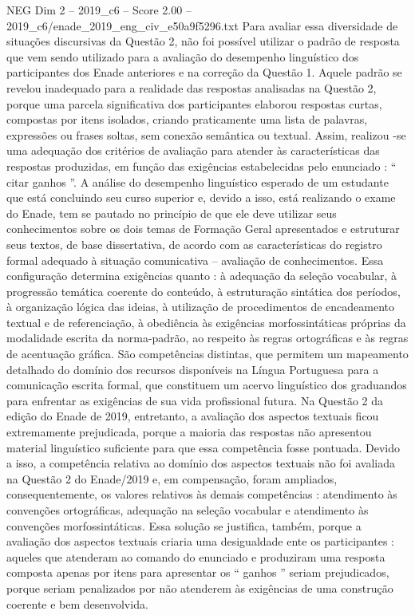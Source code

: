 \begin{textsample}{NEG Dim 2 – 2019\_c6 – Score 2.00 – 2019\_c6/enade\_2019\_eng\_civ\_e50a9f5296.txt}
Para avaliar essa diversidade de situações discursivas da Questão 2, não foi possível utilizar o padrão de resposta que vem sendo utilizado para a avaliação do desempenho linguístico dos participantes dos Enade anteriores e na correção da Questão 1.
Aquele padrão se revelou inadequado para a realidade das respostas analisadas na Questão 2, porque uma parcela significativa dos participantes elaborou respostas curtas, compostas por itens isolados, criando praticamente uma lista de palavras, expressões ou frases soltas, sem conexão semântica ou textual.
Assim, realizou -se uma adequação dos critérios de avaliação para atender às características das respostas produzidas, em função das exigências estabelecidas pelo enunciado : “ citar ganhos ”.
A análise do desempenho linguístico esperado de um estudante que está concluindo seu curso superior e, devido a isso, está realizando o exame do Enade, tem se pautado no princípio de que ele deve utilizar seus conhecimentos sobre os dois temas de Formação Geral apresentados e estruturar seus textos, de base dissertativa, de acordo com as características do registro formal adequado à situação comunicativa – avaliação de conhecimentos.
Essa configuração determina exigências quanto : à adequação da seleção vocabular, à progressão temática coerente do conteúdo, à estruturação sintática dos períodos, à organização lógica das ideias, à utilização de procedimentos de encadeamento textual e de referenciação, à obediência às exigências morfossintáticas próprias da modalidade escrita da norma-padrão, ao respeito às regras ortográficas e às regras de acentuação gráfica.
São competências distintas, que permitem um mapeamento detalhado do domínio dos recursos disponíveis na Língua Portuguesa para a comunicação escrita formal, que constituem um acervo linguístico dos graduandos para enfrentar as exigências de sua vida profissional futura.
Na Questão 2 da edição do Enade de 2019, entretanto, a avaliação dos aspectos textuais ficou extremamente prejudicada, porque a maioria das respostas não apresentou material linguístico suficiente para que essa competência fosse pontuada.
Devido a isso, a competência relativa ao domínio dos aspectos textuais não foi avaliada na Questão 2 do Enade/2019 e, em compensação, foram ampliados, consequentemente, os valores relativos às demais competências : atendimento às convenções ortográficas, adequação na seleção vocabular e atendimento às convenções morfossintáticas.
Essa solução se justifica, também, porque a avaliação dos aspectos textuais criaria uma desigualdade ente os participantes : aqueles que atenderam ao comando do enunciado e produziram uma resposta composta apenas por itens para apresentar os “ ganhos ” seriam prejudicados, porque seriam penalizados por não atenderem às exigências de uma construção coerente e bem desenvolvida.

\end{textsample}
